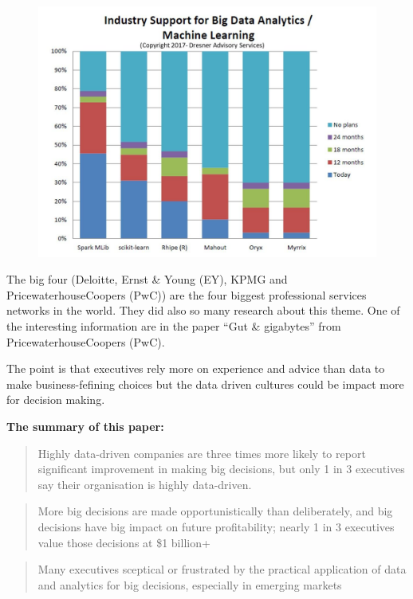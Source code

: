 \documentclass[]{book}
\begin{document}
\begin{figure}
\centering
\includegraphics{7.jpg}
\caption{}
\end{figure}

The big four (Deloitte, Ernst \& Young (EY), KPMG and
PricewaterhouseCoopers (PwC)) are the four biggest professional services
networks in the world. They did also so many research about this theme.
One of the interesting information are in the paper ``Gut \& gigabytes''
from PricewaterhouseCoopers (PwC).

The point is that executives rely more on experience and advice than
data to make business-fefining choices but the data driven cultures
could be impact more for decision making.

\textbf{The summary of this paper:}

\begin{quote}
Highly data-driven companies are three times more likely to report
significant improvement in making big decisions, but only 1 in 3
executives say their organisation is highly data-driven.
\end{quote}

\begin{quote}
More big decisions are made opportunistically than deliberately, and big
decisions have big impact on future profitability; nearly 1 in 3
executives value those decisions at \$1 billion+
\end{quote}

\begin{quote}
Many executives sceptical or frustrated by the practical application of
data and analytics for big decisions, especially in emerging markets
\end{quote}
\end{document}
